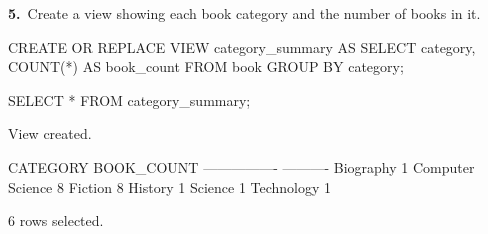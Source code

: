 \noindent\begin{minipage}{\linewidth}
\begingroup{}
{\fontsize{14}{17}\selectfont\textbf{5.}}\ Create a view showing each book category and the number of books in it.\par
\endgroup\vspace{12pt}


\begin{sqlcode}
CREATE OR REPLACE VIEW category_summary AS
SELECT category, COUNT(*) AS book_count
FROM book
GROUP BY category;

SELECT * FROM category_summary;
\end{sqlcode}

\vspace{18pt}


\begin{sqlout}[fontsize=\small]
View created.

CATEGORY          BOOK_COUNT
----------------  ----------
Biography                  1
Computer Science           8
Fiction                    8
History                    1
Science                    1
Technology                 1

6 rows selected.
\end{sqlout}
\end{minipage}\par\vspace{24pt}

